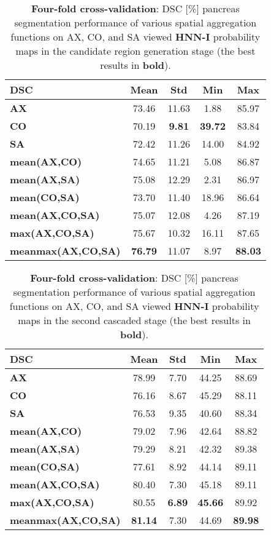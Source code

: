 \documentclass[journal]{IEEEtran}
\begin{document}
\begin{table}[htb]
\centering
\caption{\small  \textbf{Four-fold cross-validation}: DSC [\%] pancreas segmentation performance of various spatial aggregation functions on AX, CO, and SA viewed \textbf{HNN-I} probability maps in the candidate region generation stage (the best results in \textbf{bold}).}    
    \begin{tabular}{l|c|c|c|c}
	\toprule
	\toprule
\textbf{DSC} &	\textbf{Mean} & \textbf{Std} & \textbf{Min} & \textbf{Max} \\
	\midrule       
\textbf{AX} &	73.46 &	11.63 &	1.88 &	85.97 \\
\textbf{CO} &	70.19 &	\textbf{9.81} &	\textbf{39.72} &	83.84 \\
\textbf{SA} &	72.42 &	11.26 &	14.00 &	84.92 \\
\textbf{mean(AX,CO)} &	74.65 &	11.21 &	5.08 &	86.87 \\ 
\textbf{mean(AX,SA)} &	75.08 &	12.29 &	2.31 &	86.97 \\
\textbf{mean(CO,SA)} &     73.70 &       11.40 &      18.96 & 86.64 \\
\textbf{mean(AX,CO,SA)} &	75.07 &	12.08 &	4.26 &	87.19 \\
\textbf{max(AX,CO,SA)} &	75.67 &	10.32 &	16.11 &	87.65 \\
\textbf{meanmax(AX,CO,SA)} & \textbf{76.79} & 11.07  & 8.97 & \textbf{88.03} \\
    	\bottomrule
	\bottomrule
    \end{tabular}\label{tab:candidate_bb}
\end{table}
\begin{table}[htb]
\centering
\caption{\small  \textbf{Four-fold cross-validation}: DSC [\%] pancreas segmentation performance of various spatial aggregation functions on AX, CO, and SA viewed \textbf{HNN-I} probability maps in the second cascaded stage (the best results in \textbf{bold}).}
\begin{tabular}{l|c|c|c|c}
\toprule
\toprule
\textbf{DSC} &	\textbf{Mean} & \textbf{Std} & \textbf{Min} & \textbf{Max} \\
\midrule       
\textbf{AX} 					  & 78.99 & 7.70  & 44.25 & 88.69\\
\textbf{CO} 					  & 76.16 & 8.67  & 45.29 & 88.11\\
\textbf{SA} 					  & 76.53 & 9.35  & 40.60 & 88.34\\
\textbf{mean(AX,CO)} 				  & 79.02 & 7.96  & 42.64 & 88.82\\
\textbf{mean(AX,SA)}				  & 79.29 & 8.21  & 42.32 & 89.38\\ 
\textbf{mean(CO,SA)}                               & 77.61 & 8.92  & 44.14 & 89.11\\
\textbf{mean(AX,CO,SA)}                       & 80.40 & 7.30  & 45.18 & 89.11\\
\textbf{max(AX,CO,SA)}               & 80.55 & \textbf{6.89}  & \textbf{45.66} & 89.92\\
\textbf{meanmax(AX,CO,SA)} & \textbf{81.14} & 7.30  & 44.69 & \textbf{89.98}\\
    	\bottomrule
	\bottomrule
    \end{tabular}\label{tab:MV_aggregation}
\end{table}
\end{document}
